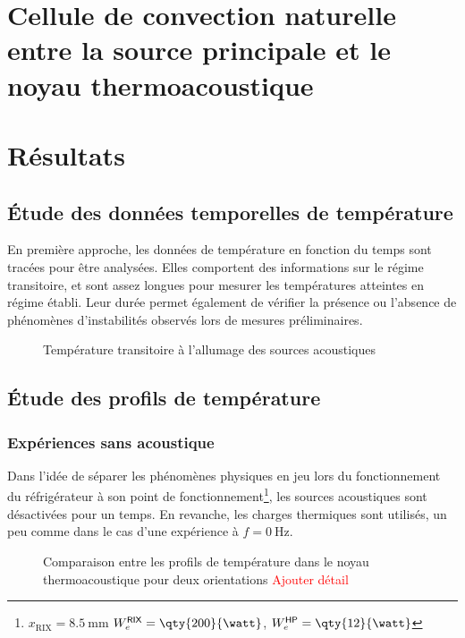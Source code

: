 \section{Cellule de convection naturelle entre la source principale et le noyau thermoacoustique}

\section{Résultats}

\subsection{\'Etude des données temporelles de température}

En première approche, les données de température en fonction du temps sont tracées pour être analysées. Elles comportent des informations sur le régime transitoire, et sont assez longues pour mesurer les températures atteintes en régime établi. Leur durée permet également de vérifier la présence ou l'absence de phénomènes d'instabilités observés lors de mesures préliminaires.

\begin{figure}[!ht]
    \centering
    
    \caption{Température transitoire à l'allumage des sources acoustiques}
    \label{fig:Vert2_LowRix_Acou}
\end{figure}

\subsection{\'Etude des profils de température}

\subsubsection{Expériences sans acoustique}

Dans l'idée de séparer les phénomènes physiques en jeu lors du fonctionnement du réfrigérateur à son point de fonctionnement\footnote{$x_{\text{RIX}}=\qty{8.5}{\mm}$ \textcolor{red}{$W_e^{\sf RIX}=\qty{200}{\watt}$}, $W_e^{\sf HP}=\qty{12}{\watt}$}, les sources acoustiques sont désactivées pour un temps. En revanche, les charges thermiques sont utilisés, un peu comme dans le cas d'une expérience à $f=\qty{0}{\hertz}$. 

\begin{figure}[ht!]
    \centering
    
    \caption{Comparaison entre les profils de température dans le noyau thermoacoustique pour deux orientations \textcolor{red}{Ajouter détail}}
    \label{fig:ProfilsHeatOnly}
\end{figure}

